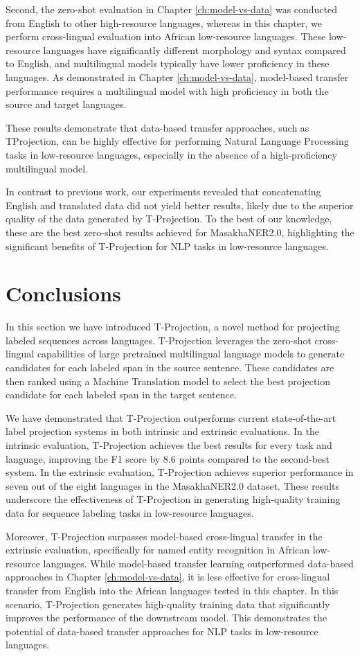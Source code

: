 Second, the zero-shot evaluation in Chapter \ref{ch:model-vs-data} was conducted from English to other high-resource languages, whereas in this chapter, we perform cross-lingual evaluation into African low-resource languages. These low-resource languages have significantly different morphology and syntax compared to English, and multilingual models typically have lower proficiency in these languages. As demonstrated in Chapter \ref{ch:model-vs-data}, model-based transfer performance requires a multilingual model with high proficiency in both the source and target languages.

These results demonstrate that data-based transfer approaches, such as T\-Projection, can be highly effective for performing Natural Language Processing tasks in low-resource languages, especially in the absence of a high-proficiency multilingual model.

In contrast to previous work, our experiments revealed that concatenating English and translated data did not yield better results, likely due to the superior quality of the data generated by T-Projection. To the best of our knowledge, these are the best zero-shot results achieved for MasakhaNER2.0, highlighting the significant benefits of T-Projection for NLP tasks in low-resource languages.

\section{Conclusions}

In this section we have introduced T-Projection, a novel method for projecting labeled sequences across languages. T-Projection leverages the zero-shot cross-lingual capabilities of large pretrained multilingual language models to generate candidates for each labeled span in the source sentence. These candidates are then ranked using a Machine Translation model to select the best projection candidate for each labeled span in the target sentence.

We have demonstrated that T-Projection outperforms current state-of-the-art label projection systems in both intrinsic and extrinsic evaluations. In the intrinsic evaluation, T-Projection achieves the best results for every task and language, improving the F1 score by 8.6 points compared to the second-best system. In the extrinsic evaluation, T-Projection achieves superior performance in seven out of the eight languages in the MasakhaNER2.0 dataset. These results underscore the effectiveness of T-Projection in generating high-quality training data for sequence labeling tasks in low-resource languages.

Moreover, T-Projection surpasses model-based cross-lingual transfer in the extrinsic evaluation, specifically for named entity recognition in African low-resource languages. While model-based transfer learning outperformed data-based approaches in Chapter \ref{ch:model-vs-data}, it is less effective for cross-lingual transfer from English into the African languages tested in this chapter. In this scenario, T-Projection generates high-quality training data that significantly improves the performance of the downstream model. This demonstrates the potential of data-based transfer approaches for NLP tasks in low-resource languages.
